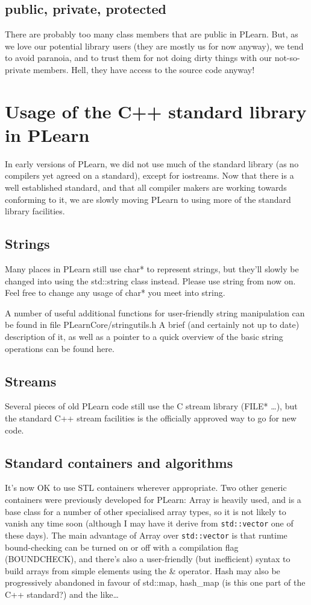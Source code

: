\documentclass[11pt]{book}
\begin{document}
\subsection*{public, private, protected}
 There are probably too many class members that are public in
PLearn. But, as we love our potential library users (they are mostly
us for now anyway), we tend to avoid paranoia, and to trust them
for not doing dirty things with our not-so-private members. Hell,
they have access to the source code anyway!

\section{Usage of the C++ standard library in PLearn} 

 In early versions of PLearn, we did not use much of the standard
library (as no compilers yet agreed on a standard), except for
iostreams. Now that there is a well established standard, and that
all compiler makers are working towards conforming to it, we are
slowly moving PLearn to using more of the standard library facilities.


\subsection*{Strings}
 Many places in PLearn still use char* to represent strings,
but they'll slowly be changed into using the std::string class
instead. Please use string from now on. Feel free to change any usage
of char* you meet into string.

 A number of useful additional functions for user-friendly string
manipulation can be found in file PLearnCore/stringutils.h A brief
(and certainly not up to date) description of it, as well as a pointer
to a quick overview of the basic string operations can be found here.

\subsection*{Streams}
 Several pieces of old PLearn code still use the C stream library
(FILE* \ldots), but the standard C++ stream facilities is the
officially approved way to go for new code.


\subsection*{Standard containers and algorithms}
 It's now OK to use STL containers wherever appropriate. Two other
generic containers were previously developed for PLearn: Array is
heavily used, and is a base class for a number of other specialised
array types, so it is not likely to vanish any time soon (although
I may have it derive from {\tt std::vector} one of these days). The
main advantage of Array over {\tt std::vector} is that runtime
bound-checking can be turned on or off with a compilation flag
(BOUNDCHECK), and there's also a user-friendly (but inefficient)
syntax to build arrays from simple elements using the \& operator. Hash
may also be progressively abandoned in favour of std::map, hash\_map
(is this one part of the C++ standard?) and the like\ldots
\end{document}
